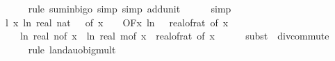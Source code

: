 \begin{isabellebody}
\ \ \ \ \isamarkupfalse%
\ {\isacharparenleft}{\kern0pt}rule\ sum{\isacharunderscore}{\kern0pt}in{\isacharunderscore}{\kern0pt}bigo{\isacharcomma}{\kern0pt}\ simp{\isacharcomma}{\kern0pt}\ simp\ add{\isacharcolon}{\kern0pt}unit{\isacharunderscore}{\kern0pt}{}{\isacharparenright}{\kern0pt}\isanewline
\ \ \ \ \isamarkupfalse%
\ simp\isanewline
\isanewline
\ \ \isamarkupfalse%
\ l{}{\isacharcolon}{\kern0pt}\ {\isachardoublequoteopen}{\isacharparenleft}{\kern0pt}{\isasymlambda}x{\isachardot}{\kern0pt}\ ln\ {\isacharparenleft}{\kern0pt}real\ {\isacharparenleft}{\kern0pt}nat\ {\isasymlceil}{}\ {\isacharslash}{\kern0pt}\ {\isacharparenleft}{\kern0pt}{\isasymdelta}{\isacharunderscore}{\kern0pt}of\ x{\isacharparenright}{\kern0pt}\ {\isacharplus}{\kern0pt}\ {}{\isacharparenright}{\kern0pt}{\isacharparenright}{\kern0pt}\ {\isasymin}\ O{\isacharbrackleft}{\kern0pt}{\isacharquery}{\kern0pt}F{\isacharbrackright}{\kern0pt}{\isacharparenleft}{\kern0pt}{\isasymlambda}x{\isachardot}{\kern0pt}\ ln\ {\isacharparenleft}{\kern0pt}{}\ {\isacharslash}{\kern0pt}\ real{\isacharunderscore}{\kern0pt}of{\isacharunderscore}{\kern0pt}rat\ {\isacharparenleft}{\kern0pt}{\isasymepsilon}{\isacharunderscore}{\kern0pt}of\ x{\isacharparenright}{\kern0pt}{\isacharparenright}{\kern0pt}\ {\isacharasterisk}{\kern0pt}\isanewline
\ \ \ \ {\isacharparenleft}{\kern0pt}ln\ {\isacharparenleft}{\kern0pt}real\ {\isacharparenleft}{\kern0pt}n{\isacharunderscore}{\kern0pt}of\ x{\isacharparenright}{\kern0pt}{\isacharparenright}{\kern0pt}\ {\isacharplus}{\kern0pt}\ ln\ {\isacharparenleft}{\kern0pt}real\ {\isacharparenleft}{\kern0pt}m{\isacharunderscore}{\kern0pt}of\ x{\isacharparenright}{\kern0pt}{\isacharparenright}{\kern0pt}{\isacharparenright}{\kern0pt}\ {\isacharslash}{\kern0pt}\ {\isacharparenleft}{\kern0pt}real{\isacharunderscore}{\kern0pt}of{\isacharunderscore}{\kern0pt}rat\ {\isacharparenleft}{\kern0pt}{\isasymdelta}{\isacharunderscore}{\kern0pt}of\ x{\isacharparenright}{\kern0pt}{\isacharparenright}{\kern0pt}\isanewline
\ \ \ \ \isamarkupfalse%
\ {\isacharparenleft}{\kern0pt}subst\ {\isacharparenleft}{\kern0pt}{}{\isacharparenright}{\kern0pt}\ div{\isacharunderscore}{\kern0pt}commute{\isacharparenright}{\kern0pt}\isanewline
\ \ \ \ \isamarkupfalse%
\ {\isacharparenleft}{\kern0pt}rule\ landau{\isacharunderscore}{\kern0pt}o{\isachardot}{\kern0pt}big{\isacharunderscore}{\kern0pt}mult{\isacharunderscore}{\kern0pt}{}{\isacharparenright}{\kern0pt}\isanewline

\end{isabellebody}
